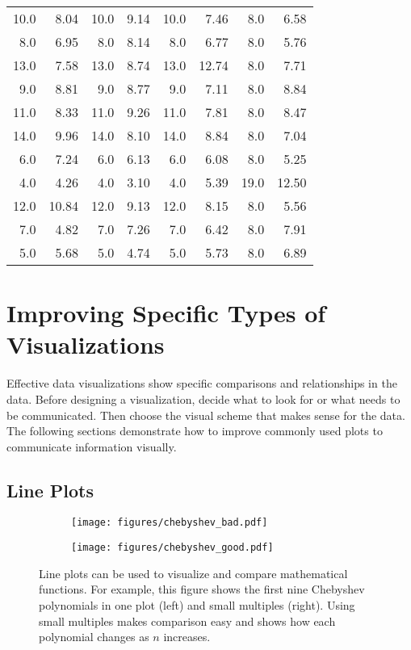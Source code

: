 \begin{problem}
\begin{table}[H]
{\begin{tabular}{rr|rr|rr|rr}
    \hline
    10.0 & 8.04  & 10.0 & 9.14 & 10.0 & 7.46  & 8.0  & 6.58  \\
    8.0  & 6.95  & 8.0  & 8.14 & 8.0  & 6.77  & 8.0  & 5.76  \\
    13.0 & 7.58  & 13.0 & 8.74 & 13.0 & 12.74 & 8.0  & 7.71  \\
    9.0  & 8.81  & 9.0  & 8.77 & 9.0  & 7.11  & 8.0  & 8.84  \\
    11.0 & 8.33  & 11.0 & 9.26 & 11.0 & 7.81  & 8.0  & 8.47  \\
    14.0 & 9.96  & 14.0 & 8.10 & 14.0 & 8.84  & 8.0  & 7.04  \\
    6.0  & 7.24  & 6.0  & 6.13 & 6.0  & 6.08  & 8.0  & 5.25  \\
    4.0  & 4.26  & 4.0  & 3.10 & 4.0  & 5.39  & 19.0 & 12.50 \\
    12.0 & 10.84 & 12.0 & 9.13 & 12.0 & 8.15  & 8.0  & 5.56  \\
    7.0  & 4.82  & 7.0  & 7.26 & 7.0  & 6.42  & 8.0  & 7.91  \\
    5.0  & 5.68  & 5.0  & 4.74 & 5.0  & 5.73  & 8.0  & 6.89  \\
\end{tabular}}
\end{table}
\label{prob:anscombes-quartet}
\end{problem}

\section*{Improving Specific Types of Visualizations} %

Effective data visualizations show specific comparisons and relationships in the data.
Before designing a visualization, decide what to look for or what needs to be communicated.
Then choose the visual scheme that makes sense for the data.
The following sections demonstrate how to improve commonly used plots to communicate information visually.

\subsection*{Line Plots} %

\begin{figure}[H] %
    \centering
    \begin{subfigure}{.47\textwidth}
        \centering
        \texttt{[image: figures/chebyshev\_bad.pdf]}
    \end{subfigure}
    \begin{subfigure}{.52\textwidth}
        \centering
        \texttt{[image: figures/chebyshev\_good.pdf]}
    \end{subfigure}
    \caption{Line plots can be used to visualize and compare mathematical functions. For example, this figure shows the first nine Chebyshev polynomials in one plot (left) and small multiples (right). Using small multiples makes comparison easy and shows how each polynomial changes as $n$ increases.}
    \label{fig:chebyshev}
\end{figure}

